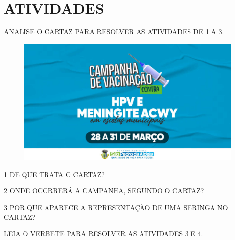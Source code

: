 \section*{ATIVIDADES}

ANALISE O CARTAZ PARA RESOLVER AS ATIVIDADES DE 1 A 3.

\begin{figure}[H]
\includegraphics[width=\textwidth]{media/image256.png}
\end{figure}

\num{1} DE QUE TRATA O CARTAZ?


\num{2} ONDE OCORRERÁ A CAMPANHA, SEGUNDO O CARTAZ?


\num{3} POR QUE APARECE A REPRESENTAÇÃO DE UMA SERINGA NO CARTAZ?


LEIA O VERBETE PARA RESOLVER AS ATIVIDADES 3 E 4.

